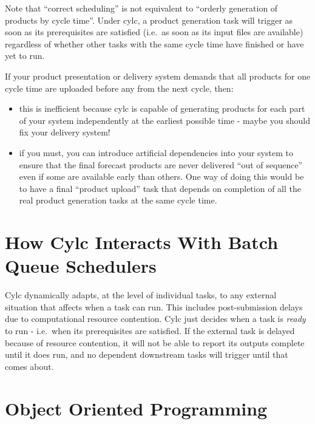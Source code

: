 \documentclass[11pt,a4paper]{article}
\begin{document}
Note that ``correct scheduling'' is not equivalent to ``orderly
generation of products by cycle time''.  Under cylc, a product
generation task will trigger as soon as its prerequisites are satisfied 
(i.e.\ as soon as its input files are available) regardless of
whether other tasks with the same cycle time have finished or have yet
to run. 

If your product presentation or delivery system demands that all
products for one cycle time are uploaded before any from the next
cycle, then:

\begin{itemize}
    \item this is inefficient because cylc is capable of generating products 
        for each part of your system independently at the earliest
        possible time - maybe you should fix your delivery system!
    \item if you must, you can introduce artificial dependencies into
        your system to ensure that the final forecast products are never
        delivered ``out of sequence'' even if some are available early
        than others.  One way of doing this would be to have a final
        ``product upload'' task that depends on completion of all the
        real product generation tasks at the same cycle time.
\end{itemize}

\pagebreak
\section{How Cylc Interacts With Batch Queue Schedulers}
\label{HowCylcInteractsWithBatchQueueSchedulers}

Cylc dynamically adapts, at the level of individual tasks, to any
external situation that affects when a task can run. This includes
post-submission delays due to computational resource contention. Cylc
just decides when a task is {\em ready} to run - i.e.\ when its
prerequisites are satisfied.  If the external task is delayed because of
resource contention, it will not be able to report its outputs complete
until it does run, and no dependent downstream tasks will trigger until
that comes about.


\pagebreak
\appendix

\section{Object Oriented Programming}
\label{ObjectOrientedProgramming}
\end{document}
